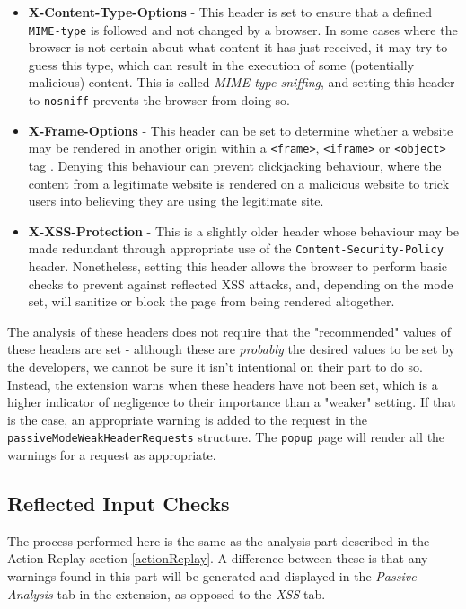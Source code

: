 \begin{itemize}
	\item \textbf{X-Content-Type-Options} - This header is set to ensure that a defined \texttt{MIME-type} is followed and not changed by a browser. In some cases where the browser is not certain about what content it has just received, it may try to guess this type, which can result in the execution of some (potentially malicious) content. This is called \textit{MIME-type sniffing}, and setting this header to \texttt{nosniff} prevents the browser from doing so.
	
	\item \textbf{X-Frame-Options} - This header can be set to determine whether a website may be rendered in another origin within a \texttt{<frame>}, \texttt{<iframe>} or \texttt{<object>} tag \cite{xFrameOptions}. Denying this behaviour can prevent clickjacking behaviour, where the content from a legitimate website is rendered on a malicious website to trick users into believing they are using the legitimate site.
	
	\item \textbf{X-XSS-Protection} - This is a slightly older header whose behaviour may be made redundant through appropriate use of the \texttt{Content-Security-Policy} header. Nonetheless, setting this header allows the browser to perform basic checks to prevent against reflected XSS attacks, and, depending on the mode set, will sanitize or block the page from being rendered altogether.
	
\end{itemize}

The analysis of these headers does not require that the "recommended" values of these headers are set - although these are \textit{probably} the desired values to be set by the developers, we cannot be sure it isn't intentional on their part to do so. Instead, the extension warns when these headers have not been set, which is a higher indicator of negligence to their importance than a "weaker" setting. If that is the case, an appropriate warning is added to the request in the \texttt{passiveModeWeakHeaderRequests} structure. The \texttt{popup} page will render all the warnings for a request as appropriate. 

\subsection{Reflected Input Checks}

The process performed here is the same as the analysis part described in the Action Replay section \ref{actionReplay}. A difference between these is that any warnings found in this part will be generated and displayed in the \textit{Passive Analysis} tab in the extension, as opposed to the \textit{XSS} tab.

